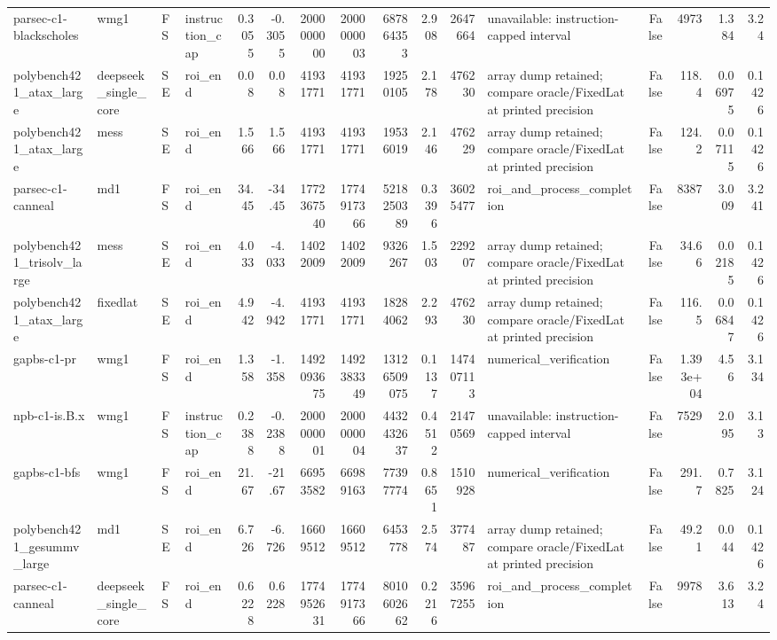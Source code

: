\begin{tabular}{llllrrrrrrrlrrrr}
parsec-c1-blackscholes & wmg1 & FS & instruction\_cap & 0.3055 & -0.3055 & 2000000000 & 2000000003 & 687864353 & 2.908 & 2647664 & unavailable: instruction-capped interval & False & 4973 & 1.384 & 3.24 \\
polybench421\_atax\_large & deepseek\_single\_core & SE & roi\_end & 0.08 & 0.08 & 41931771 & 41931771 & 19250105 & 2.178 & 476230 & array dump retained; compare oracle/FixedLat at printed precision & False & 118.4 & 0.06975 & 0.1426 \\
polybench421\_atax\_large & mess & SE & roi\_end & 1.566 & 1.566 & 41931771 & 41931771 & 19536019 & 2.146 & 476229 & array dump retained; compare oracle/FixedLat at printed precision & False & 124.2 & 0.07115 & 0.1426 \\
parsec-c1-canneal & md1 & FS & roi\_end & 34.45 & -34.45 & 1772367540 & 1774917366 & 5218250389 & 0.3396 & 36025477 & roi\_and\_process\_completion & False & 8387 & 3.009 & 3.241 \\
polybench421\_trisolv\_large & mess & SE & roi\_end & 4.033 & -4.033 & 14022009 & 14022009 & 9326267 & 1.503 & 229207 & array dump retained; compare oracle/FixedLat at printed precision & False & 34.66 & 0.02185 & 0.1426 \\
polybench421\_atax\_large & fixedlat & SE & roi\_end & 4.942 & -4.942 & 41931771 & 41931771 & 18284062 & 2.293 & 476230 & array dump retained; compare oracle/FixedLat at printed precision & False & 116.5 & 0.06847 & 0.1426 \\
gapbs-c1-pr & wmg1 & FS & roi\_end & 1.358 & -1.358 & 1492093675 & 1492383349 & 13126509075 & 0.1137 & 147407113 & numerical\_verification & False & 1.393e+04 & 4.56 & 3.134 \\
npb-c1-is.B.x & wmg1 & FS & instruction\_cap & 0.2388 & -0.2388 & 2000000001 & 2000000004 & 4432432637 & 0.4512 & 21470569 & unavailable: instruction-capped interval & False & 7529 & 2.095 & 3.13 \\
gapbs-c1-bfs & wmg1 & FS & roi\_end & 21.67 & -21.67 & 66953582 & 66989163 & 77397774 & 0.8651 & 1510928 & numerical\_verification & False & 291.7 & 0.7825 & 3.124 \\
polybench421\_gesummv\_large & md1 & SE & roi\_end & 6.726 & -6.726 & 16609512 & 16609512 & 6453778 & 2.574 & 377487 & array dump retained; compare oracle/FixedLat at printed precision & False & 49.21 & 0.044 & 0.1426 \\
parsec-c1-canneal & deepseek\_single\_core & FS & roi\_end & 0.6228 & 0.6228 & 1774952631 & 1774917366 & 8010602662 & 0.2216 & 35967255 & roi\_and\_process\_completion & False & 9978 & 3.613 & 3.24 \\

\end{tabular}

